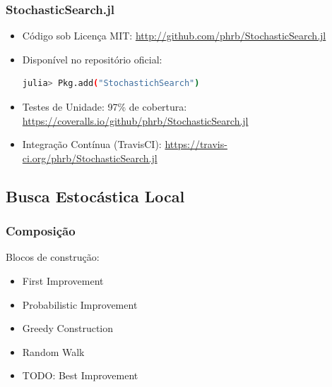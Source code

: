 \documentclass[10pt, compress]{beamer}
\begin{document}
\begin{frame}[fragile]
    \frametitle{StochasticSearch.jl}
    \begin{itemize}
        \item Código sob Licença MIT:
            \url{http://github.com/phrb/StochasticSearch.jl}
        \item Disponível no \alert{repositório oficial}:
            \begin{lstlisting}[language=bash]
julia> Pkg.add("StochastichSearch")
            \end{lstlisting}
        \item Testes de Unidade: \alert{97\%} de cobertura:
                \url{https://coveralls.io/github/phrb/StochasticSearch.jl}
        \item Integração Contínua (\alert{TravisCI}):
            \url{https://travis-ci.org/phrb/StochasticSearch.jl}
    \end{itemize}
\end{frame}

\subsection{Busca Estocástica Local}

\begin{frame}[fragile]
    \frametitle{Composição}
    Blocos de construção:
    \begin{itemize}
        \item First Improvement
        \item Probabilistic Improvement
        \item Greedy Construction
        \item Random Walk
        \item \alert{TODO}: Best Improvement
    \end{itemize}
\end{frame}
\end{document}
